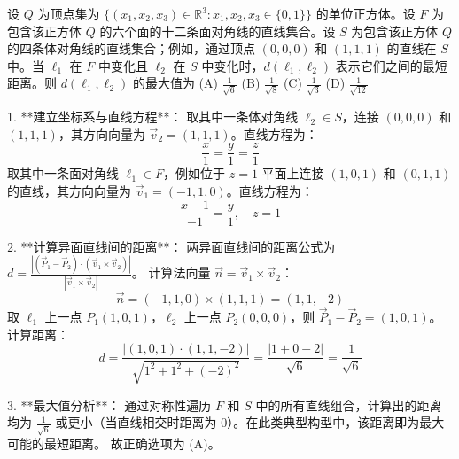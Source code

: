 \begin{questions}
    \question 设 $Q$ 为顶点集为 $\{(x_1, x_2, x_3) \in \mathbb{R}^3 : x_1, x_2, x_3 \in \{0, 1\}\}$ 的单位正方体。设 $F$ 为包含该正方体 $Q$ 的六个面的十二条面对角线的直线集合。设 $S$ 为包含该正方体 $Q$ 的四条体对角线的直线集合；例如，通过顶点 $(0,0,0)$ 和 $(1,1,1)$ 的直线在 $S$ 中。当 $\ell_1$ 在 $F$ 中变化且 $\ell_2$ 在 $S$ 中变化时，$d(\ell_1, \ell_2)$ 表示它们之间的最短距离。则 $d(\ell_1, \ell_2)$ 的最大值为
(A) $\frac{1}{\sqrt{6}}$ \qquad (B) $\frac{1}{\sqrt{8}}$ \qquad (C) $\frac{1}{\sqrt{3}}$ \qquad (D) $\frac{1}{\sqrt{12}}$

\begin{solution}
1. **建立坐标系与直线方程**：
   取其中一条体对角线 $\ell_2 \in S$，连接 $(0,0,0)$ 和 $(1,1,1)$，其方向向量为 $\vec{v}_2 = (1, 1, 1)$。直线方程为：
   \[
   \frac{x}{1} = \frac{y}{1} = \frac{z}{1}
   \]
   取其中一条面对角线 $\ell_1 \in F$，例如位于 $z=1$ 平面上连接 $(1,0,1)$ 和 $(0,1,1)$ 的直线，其方向向量为 $\vec{v}_1 = (-1, 1, 0)$。直线方程为：
   \[
   \frac{x-1}{-1} = \frac{y}{1}, \quad z=1
   \]

2. **计算异面直线间的距离**：
   两异面直线间的距离公式为 $d = \frac{|(\vec{P}_1 - \vec{P}_2) \cdot (\vec{v}_1 \times \vec{v}_2)|}{|\vec{v}_1 \times \vec{v}_2|}$。
   计算法向量 $\vec{n} = \vec{v}_1 \times \vec{v}_2$：
   \[
   \vec{n} = (-1, 1, 0) \times (1, 1, 1) = (1, 1, -2)
   \]
   取 $\ell_1$ 上一点 $P_1(1, 0, 1)$，$\ell_2$ 上一点 $P_2(0, 0, 0)$，则 $\vec{P}_1 - \vec{P}_2 = (1, 0, 1)$。
   计算距离：
   \[
   d = \frac{|(1, 0, 1) \cdot (1, 1, -2)|}{\sqrt{1^2 + 1^2 + (-2)^2}} = \frac{|1 + 0 - 2|}{\sqrt{6}} = \frac{1}{\sqrt{6}}
   \]

3. **最大值分析**：
   通过对称性遍历 $F$ 和 $S$ 中的所有直线组合，计算出的距离均为 $\frac{1}{\sqrt{6}}$ 或更小（当直线相交时距离为 0）。在此类典型构型中，该距离即为最大可能的最短距离。
   故正确选项为 (A)。
\end{solution}



\end{questions}

